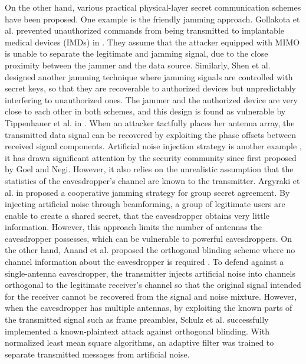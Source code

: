 On the other hand, various practical physical-layer secret communication schemes  have been proposed.
One example is the friendly jamming approach.
Gollakota et al. prevented unauthorized commands from being transmitted to implantable medical devices (IMDs) in \cite{gollakota2011they}. They assume that the attacker equipped with MIMO is unable to separate the legitimate and jamming signal, due to the close proximity between the jammer and the data source. Similarly, Shen et al. \cite{shen2013ally} designed another jamming technique where jamming signals are controlled with secret keys, so that they are recoverable to authorized devices but unpredictably interfering to unauthorized ones. The jammer and the authorized device are very close to each other in both schemes, and this design is found as vulnerable by Tippenhauer et al. in \cite{tippenhauer2013limitations}. When an attacker tactfully places
her antenna array, the transmitted data signal can be recovered by exploiting the phase offsets between received signal components.
Artificial noise injection strategy \cite{negi2005secret,goel2008guaranteeing,liao2010qos,li2011safe} is another example  \cite{negi2005secret,goel2008guaranteeing,liao2010qos,li2011safe}, it has drawn significant attention by the security community since first proposed by Goel and Negi. However, it also relies on the unrealistic assumption that the statistics of the eavesdropper's channel are known to the transmitter. Argyraki et al.  in \cite{argyraki2013creating} proposed a cooperative jamming strategy for group secret agreement. By injecting  artificial noise through beamforming, a group of legitimate users are enable to create a shared secret, that the eavesdropper obtains very little information. However, this approach limits the number of antennas the eavesdropper possesses, which can be vulnerable to powerful eavesdroppers. On the other hand, Anand et al. proposed the orthogonal blinding scheme where no channel information about the eavesdropper is required \cite{anand2012strobe}.
To defend against a single-antenna eavesdropper, the transmitter injects artificial noise into channels orthogonal to the legitimate receiver's channel so that the original signal intended for the receiver cannot be recovered from the signal and noise mixture. However, when the eavesdropper has multiple antennas, by exploiting the known parts of the transmitted signal such as frame preambles, Schulz et al. \cite{schulz2014practical} successfully implemented a known-plaintext attack against orthogonal blinding. With normalized least mean square algorithms, an adaptive filter was trained to separate transmitted messages from artificial noise.

